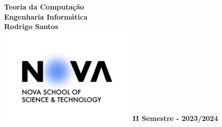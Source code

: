 \begin{titlepage}
  \begin{center}
    \vspace*{1cm}
    \Huge
    \textbf{Teoria da Computação} \\
    \vspace{0.5cm}
    \LARGE
    \textbf{Engenharia Informática} \\
    \vspace{1.5cm}
    \Large
    \textbf{Rodrigo Santos} \\
    \vfill
      \centering
      \includegraphics[width=0.5\textwidth]{images/nova_logo.png}
    \vfill
    \Large
    \textbf{II Semestre - 2023/2024}
  \end{center}
\end{titlepage}